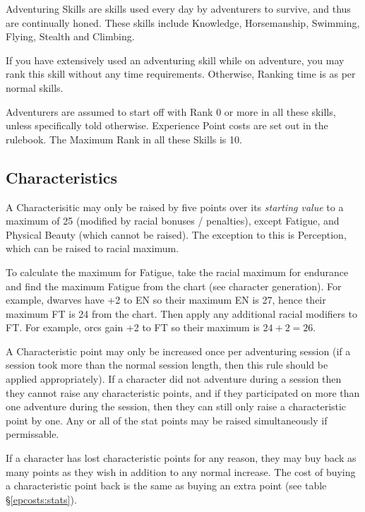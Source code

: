 \begin{multicols}{3}
Adventuring Skills are skills used every day by adventurers to
survive, and thus are continually honed. These skills include
Knowledge, Horsemanship, Swimming, Flying, Stealth and Climbing.

If you have extensively used an adventuring skill while on adventure,
you may rank this skill without any time requirements. Otherwise,
Ranking time is as per normal skills.

Adventurers are assumed to start off with Rank 0 or more in all these
skills, unless specifically told otherwise. Experience Point costs are
set out in the rulebook.  The Maximum Rank in all these Skills is 10.

\subsection{Characteristics}

A Characterisitic may only be raised by five points over its
\emph{starting value} to a maximum of 25 (modified by racial bonuses /
penalties), except Fatigue, and Physical Beauty (which cannot be
raised).  The exception to this is Perception, which can be raised to
racial maximum.

To calculate the maximum for Fatigue, take the racial maximum for
endurance and find the maximum Fatigue from the chart (see character
generation).  For example, dwarves have +2 to EN so their maximum EN
is 27, hence their maximum FT is 24 from the chart.  Then apply any
additional racial modifiers to FT.  For example, orcs gain +2 to FT so
their maximum is $24 + 2 = 26$.

A Characteristic point may only be increased once per adventuring
session (if a session took more than the normal session length, then
this rule should be applied appropriately).  If a character did not
adventure during a session then they cannot raise any characteristic
points, and if they participated on more than one adventure during the
session, then they can still only raise a characteristic point by one.
Any or all of the stat points may be raised simultaneously if
permissable.

If a character has lost characteristic points for any reason, they may
buy back as many points as they wish in addition to any normal
increase.  The cost of buying a characteristic point back is the same
as buying an extra point (see table \S\ref{epcosts:stats}).

\raggedcolumns\newpage\end{multicols}
